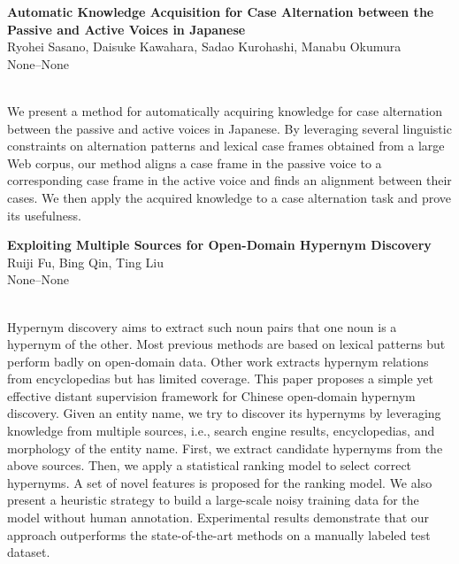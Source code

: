 \documentclass[twoside,makeidx]{book}
\renewcommand{\normalsize}{\fontsize{8}{9}\selectfont}
\renewcommand{\small}{\fontsize{7}{8}\selectfont}
\begin{document}
\par\vspace{2em}\noindent%
\begin{minipage}{\linewidth}%
\begin{center}
\textbf{\normalsize Automatic Knowledge Acquisition for Case Alternation between the Passive and Active Voices in Japanese}\\
\normalsize  Ryohei Sasano,  Daisuke Kawahara,  Sadao Kurohashi,  Manabu Okumura\\
{\small None--None}\\
\end{center}
\end{minipage}\\[0.5em]
\nopagebreak%
\noindent%
{\small We present a method for automatically acquiring knowledge for case alternation between the passive and active voices in Japanese. By leveraging several linguistic constraints on alternation patterns and lexical case frames obtained from a large Web corpus, our method aligns a case frame in the passive voice to a corresponding case frame in the active voice and finds an alignment between their cases. We then apply the acquired knowledge to a case alternation task and prove its usefulness.}
\par\vspace{2em}\noindent%
\begin{minipage}{\linewidth}%
\begin{center}
\textbf{\normalsize Exploiting Multiple Sources for Open-Domain Hypernym Discovery}\\
\normalsize  Ruiji Fu,  Bing Qin,  Ting Liu\\
{\small None--None}\\
\end{center}
\end{minipage}\\[0.5em]
\nopagebreak%
\noindent%
{\small Hypernym discovery aims to extract such noun pairs that one noun is a hypernym of the other. Most previous methods are based on lexical patterns but perform badly on open-domain data. Other work extracts hypernym relations from encyclopedias but has limited coverage. This paper proposes a simple yet effective distant supervision framework for Chinese open-domain hypernym discovery. Given an entity name, we try to discover its hypernyms by leveraging knowledge from multiple sources, i.e., search engine results, encyclopedias, and morphology of the entity name. First, we extract candidate hypernyms from the above sources. Then, we apply a statistical ranking model to select correct hypernyms. A set of novel features is proposed for the ranking model. We also present a heuristic strategy to build a large-scale noisy training data for the model without human annotation. Experimental results demonstrate that our approach outperforms the state-of-the-art methods on a manually labeled test dataset.}
\end{document}
